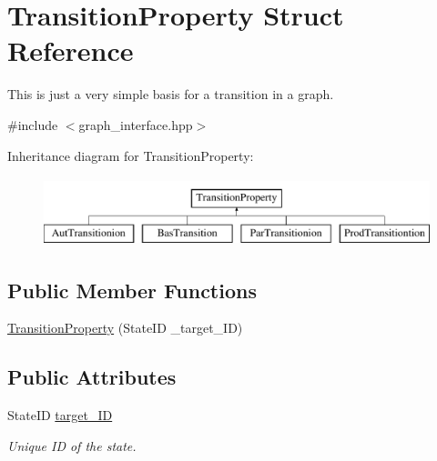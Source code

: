 \hypertarget{structTransitionProperty}{\section{\-Transition\-Property \-Struct \-Reference}
\label{structTransitionProperty}
}


\-This is just a very simple basis for a transition in a graph.  




{\ttfamily \#include $<$graph\-\_\-interface.\-hpp$>$}

\-Inheritance diagram for \-Transition\-Property\-:\begin{figure}[H]
\begin{center}
\leavevmode
\includegraphics[height=2.000000cm]{structTransitionProperty}
\end{center}
\end{figure}
\subsection*{\-Public \-Member \-Functions}
\begin{DoxyCompactItemize}
\item 
\hyperlink{structTransitionProperty_a751d0faf12a55387f4a9680988401755}{\-Transition\-Property} (\-State\-I\-D \-\_\-target\-\_\-\-I\-D)
\end{DoxyCompactItemize}
\subsection*{\-Public \-Attributes}
\begin{DoxyCompactItemize}
\item 
\hypertarget{structTransitionProperty_a1e272cf5a26a0db442ac0fed5b797386}{\-State\-I\-D \hyperlink{structTransitionProperty_a1e272cf5a26a0db442ac0fed5b797386}{target\-\_\-\-I\-D}}\label{structTransitionProperty_a1e272cf5a26a0db442ac0fed5b797386}

\begin{DoxyCompactList}\small\item\em \-Unique \-I\-D of the state. \end{DoxyCompactList}\end{DoxyCompactItemize}


